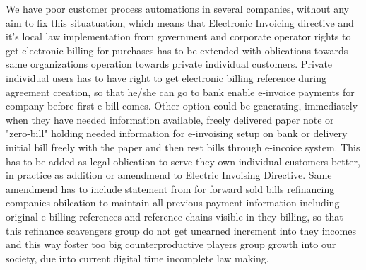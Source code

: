 We have poor customer process automations in several companies,
without any aim to fix this situatuation, which means
that Electronic Invoicing directive\cite{EULEX_2014_55} and it's local law
imp\-le\-men\-ta\-tion\cite{LEX_2019_241} from government and corporate operator
rights to get electronic billing for purchases has to be extended with
oblications towards same organizations operation towards private individual
customers. Private individual users has to have right to get electronic
billing reference during agreement creation, so that he/she can go to bank
enable e-invoice payments for company before first e-bill comes. Other option
could be generating, immediately when they have needed information available,
freely delivered paper note or "zero-bill" holding needed information for
e-invoising setup on bank or delivery initial bill freely with the paper and
then rest bills through e-incoice system. This has to be added as legal
oblication to serve they own individual customers better, in practice as
addition or amendmend to Electric Invoising Directive\cite{EULEX_2014_55}.
Same amendmend has to include statement from for forward sold bills
refinancing companies obilcation to maintain all previous payment information
including original e-billing references and reference chains visible in they
billing, so that this refinance scavengers group do not get unearned increment
into they incomes and this way foster too big counterproductive players group
growth into our society, due into current digital time incomplete law making.

\begin{comment}\end{comment}

